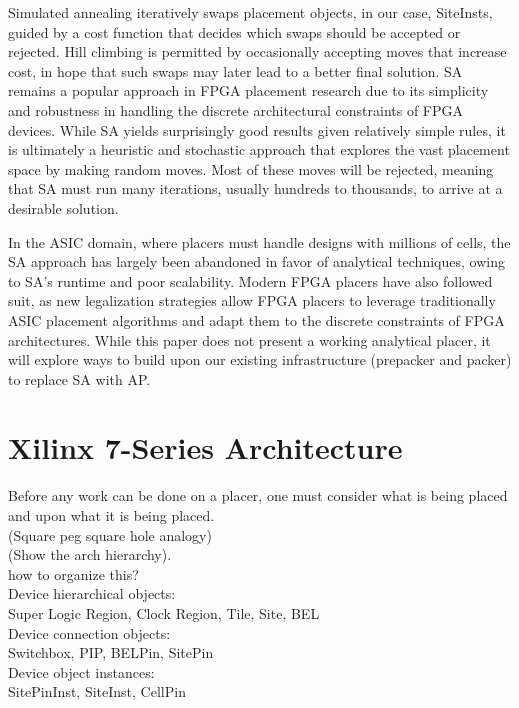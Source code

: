 \documentclass{article}
\begin{document}
\begin{multicols}{2}
    Simulated annealing iteratively swaps placement objects, in our case, SiteInsts, guided by a cost function that decides which swaps should be accepted or rejected. Hill climbing is permitted by occasionally accepting moves that increase cost, in hope that such swaps may later lead to a better final solution. SA remains a popular approach in FPGA placement research due to its simplicity and robustness in handling the discrete architectural constraints of FPGA devices. While SA yields surprisingly good results given relatively simple rules, it is ultimately a heuristic and stochastic approach that explores the vast placement space by making random moves. Most of these moves will be rejected, meaning that SA must run many iterations, usually hundreds to thousands, to arrive at a desirable solution.

    In the ASIC domain, where placers must handle designs with millions of cells, the SA approach has largely been abandoned in favor of analytical techniques, owing to SA's runtime and poor scalability. Modern FPGA placers have also followed suit, as new legalization strategies allow FPGA placers to leverage traditionally ASIC placement algorithms and adapt them to the discrete constraints of FPGA architectures. While this paper does not present a working analytical placer, it will explore ways to build upon our existing infrastructure (prepacker and packer) to replace SA with AP.

\section{Xilinx 7-Series Architecture}
    Before any work can be done on a placer, one must consider what is being placed and upon what it is being placed. \\
    (Square peg square hole analogy) \\
    (Show the arch hierarchy). \\

    how to organize this? \\

    Device hierarchical objects: \\
        Super Logic Region, Clock Region, Tile, Site, BEL \\

    Device connection objects: \\
        Switchbox, PIP, BELPin, SitePin \\

    Device object instances: \\
        SitePinInst, SiteInst, CellPin


\end{multicols}
\end{document}
